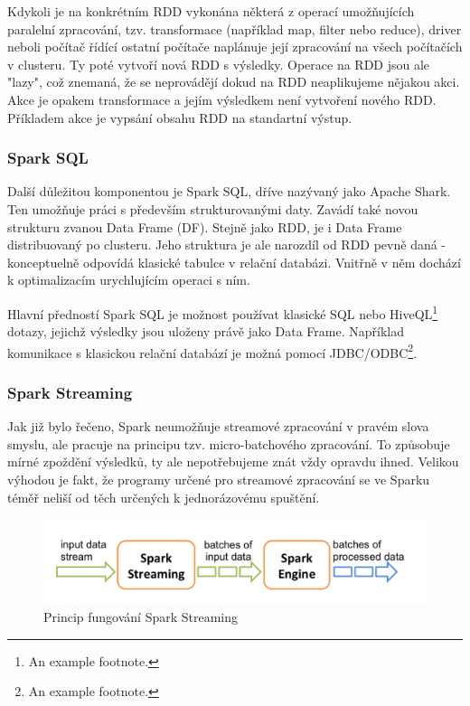 \documentclass[thesis=B,czech]{FITthesis}[2012/06/26]
\begin{document}
	Kdykoli je na konkrétním RDD vykonána některá z operací umožňujících paralelní zpracování, tzv. transformace (například map, filter nebo reduce), driver neboli počítač řídící ostatní počítače naplánuje její zpracování na všech počítačích v clusteru. Ty poté vytvoří nová RDD s výsledky. Operace na RDD jsou ale "lazy", což znemaná, že se neprovádějí dokud na RDD neaplikujeme nějakou akci. Akce je opakem transformace a jejím výsledkem není vytvoření nového RDD. Příkladem akce je vypsání obsahu RDD na standartní výstup. 

\subsubsection{Spark SQL}
	Další důležitou komponentou je Spark SQL, dříve nazývaný jako Apache Shark. Ten umožňuje práci s především strukturovanými daty. Zavádí také novou strukturu zvanou Data Frame (DF). Stejně jako RDD, je i Data Frame distribuovaný po clusteru. Jeho struktura je ale narozdíl od RDD pevně daná - konceptuelně odpovídá klasické tabulce v relační databázi. Vnitřně v něm dochází k optimalizacím urychlujícím operaci s ním. 
	
	Hlavní předností Spark SQL je možnost používat klasické SQL nebo HiveQL\footnote{An example footnote.} dotazy, jejichž výsledky jsou uloženy právě jako Data Frame. Například komunikace s klasickou relační databází je možná pomocí JDBC/ODBC\footnote{An example footnote.}. 


\subsubsection{Spark Streaming}
	Jak již bylo řečeno, Spark neumožňuje streamové zpracování v pravém slova smyslu, ale pracuje na principu tzv. micro-batchového zpracování. To způsobuje mírné zpoždění výsledků, ty ale nepotřebujeme znát vždy opravdu ihned. Velikou výhodou je fakt, že programy určené pro streamové zpracování se ve Sparku téměř neliší od těch určených k jednorázovému spuštění. 

	\begin{figure}[ht]
    	\centering
    	\includegraphics[width=1\textwidth]{images/spark-streaming-flow.png}
    	\caption{Princip fungování Spark Streaming\cite{streaming-guide}}
    	\label{fig:spark_streaming_flow}
	\end{figure}
	
\end{document}
